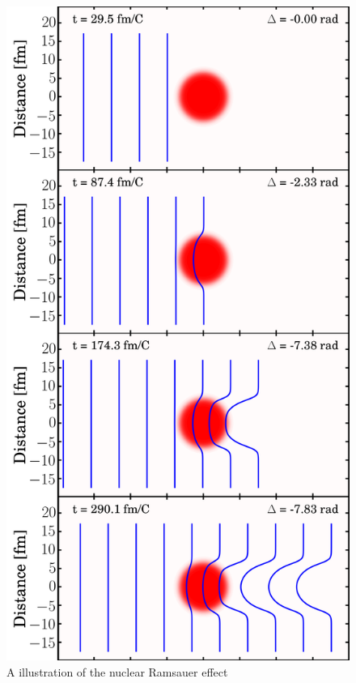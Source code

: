 \begin{eqation}
\begin{figure}
    \hfill\begin{minipage}{0.5\textwidth}\centering
        \includegraphics[scale=0.2]{figures/phaseShiftStillsFigure.png}
        \caption{A illustration of the nuclear Ramsauer effect}
        \label{RamsauerPhaseShiftFigure}
    \end{minipage}
\end{figure}


\end{eqation}

